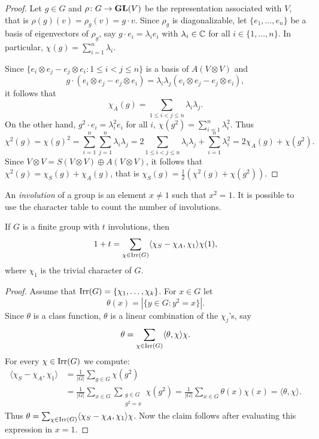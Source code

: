 \begin{proof}
    Let $g\in G$ and $\rho\colon G\to\mathbf{GL}(V)$ be the representation
    associated with $V$, that is $\rho(g)(v)=\rho_g(v)=g\cdot v$. 
    Since $\rho_g$ is diagonalizable, let $\{e_1,\dots,e_n\}$ 
    be a basis of eigenvectors of $\rho_g$, say
    $g\cdot e_i=\lambda_ie_i$ with $\lambda_i\in\mathbb{C}$ for all $i\in\{1,\dots,n\}$. In particular, $\chi(g)=\sum_{i=1}^n\lambda_i$. 
    
    Since $\{e_i\otimes e_j-e_j\otimes e_i:1\leq i<j\leq n\}$ is a basis of
    $A(V\otimes V)$ and 
    \[
    g\cdot (e_i\otimes e_j-e_j\otimes e_i)=\lambda_i\lambda_j(e_i\otimes e_j-e_j\otimes e_i),
    \]
    it follows that
    \[
    \chi_A(g)=\sum_{1\leq i<j\leq n}\lambda_i\lambda_j.
    \]
    On the other hand,
    $g^2\cdot e_i=\lambda_i^2e_i$ for all $i$,
    $\chi(g^2)=\sum_{i=1}^n\lambda_i^2$. Thus 
    \[
    \chi^2(g)=\chi(g)^2=\sum_{i=1}^n\sum_{j=1}^n\lambda_i\lambda_j=2\sum_{1\leq i<j\leq n}\lambda_i\lambda_j+\sum_{i=1}^n\lambda_i^2=2\chi_A(g)+\chi(g^2).
    \]
    Since $V\otimes V=S(V\otimes V)\oplus A(V\otimes V)$, it follows that  
    $\chi^2(g)=\chi_S(g)+\chi_A(g)$, that is 
    $\chi_S(g)=\frac12(\chi^2(g)+\chi(g^2))$.
\end{proof}

An \emph{involution} of a group is an element $x\ne 1$ such that $x^2=1$. 
It is possible to use the character table to count the number
of involutions.

\begin{proposition}
    If $G$ is a finite group with $t$ involutions, then
    \[
        1+t=\sum_{\chi\in\operatorname{Irr}(G)}\langle\chi_S-\chi_A,\chi_1\rangle\chi(1),
    \]
    where $\chi_1$ is 
    the trivial character of $G$.
\end{proposition}

\begin{proof}
    Assume that $\operatorname{Irr}(G)=\{\chi_1,\dots,\chi_k\}$.  
    For $x\in G$ let 
    \[
    \theta(x)=|\{y\in G:y^2=x\}|.
    \]
    Since $\theta$ is a class function, 
    $\theta$ is a linear combination of the $\chi_j$'s, say 
    \[
    \theta=\sum_{\chi\in\operatorname{Irr}(G)}\langle\theta,\chi\rangle\chi.
    \]
    For every $\chi\in\operatorname{Irr}(G)$ we compute: 
    \begin{align*}
        \langle\chi_S-\chi_A,\chi_1\rangle 
        &=\frac{1}{|G|}\sum_{g\in G}\chi(g^2)\\
        &=\frac{1}{|G|}\sum_{x\in G}\sum_{\substack{g\in G\\g^2=x}}\chi(g^2)
        =\frac{1}{|G|}\sum_{x\in G}\theta(x)\chi(x)=\langle\theta,\chi\rangle.
    \end{align*}
    Thus $\theta=\sum_{\chi\in\operatorname{Irr}(G)}\langle\chi_S-\chi_A,\chi_1\rangle\chi$. Now
    the claim follows after evaluating this expression in 
    $x=1$. 
\end{proof}

